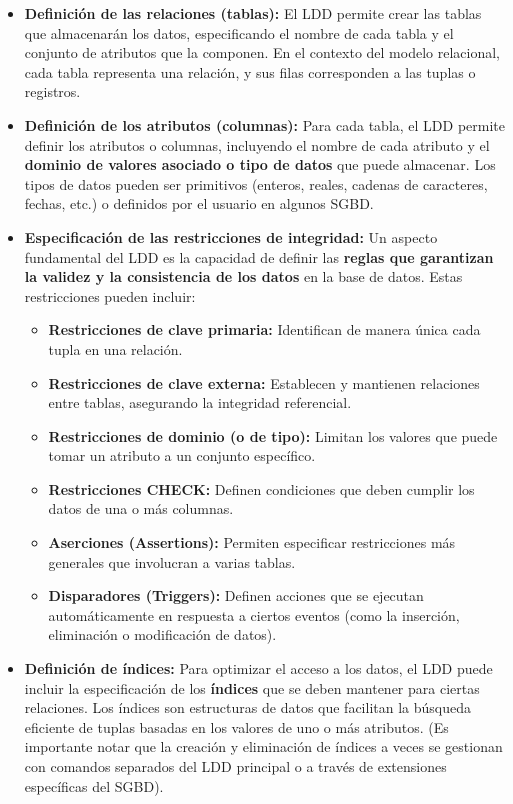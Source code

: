 \begin{itemize}
    \item \textbf{Definición de las relaciones (tablas):} El LDD permite crear las tablas que almacenarán los datos, especificando el nombre de cada tabla y el conjunto de atributos que la componen. En el contexto del modelo relacional, cada tabla representa una relación, y sus filas corresponden a las tuplas o registros.

    \item \textbf{Definición de los atributos (columnas):} Para cada tabla, el LDD permite definir los atributos o columnas, incluyendo el nombre de cada atributo y el \textbf{dominio de valores asociado o tipo de datos} que puede almacenar. Los tipos de datos pueden ser primitivos (enteros, reales, cadenas de caracteres, fechas, etc.) o definidos por el usuario en algunos SGBD.

    \item \textbf{Especificación de las restricciones de integridad:} Un aspecto fundamental del LDD es la capacidad de definir las \textbf{reglas que garantizan la validez y la consistencia de los datos} en la base de datos. Estas restricciones pueden incluir:

    \begin{itemize}
        \item \textbf{Restricciones de clave primaria:} Identifican de manera única cada tupla en una relación.
        \item \textbf{Restricciones de clave externa:} Establecen y mantienen relaciones entre tablas, asegurando la integridad referencial.
        \item \textbf{Restricciones de dominio (o de tipo):} Limitan los valores que puede tomar un atributo a un conjunto específico.
        \item \textbf{Restricciones CHECK:} Definen condiciones que deben cumplir los datos de una o más columnas.
        \item \textbf{Aserciones (Assertions):} Permiten especificar restricciones más generales que involucran a varias tablas.
        \item \textbf{Disparadores (Triggers):} Definen acciones que se ejecutan automáticamente en respuesta a ciertos eventos (como la inserción, eliminación o modificación de datos).
    \end{itemize}

    \item \textbf{Definición de índices:} Para optimizar el acceso a los datos, el LDD puede incluir la especificación de los \textbf{índices} que se deben mantener para ciertas relaciones. Los índices son estructuras de datos que facilitan la búsqueda eficiente de tuplas basadas en los valores de uno o más atributos. (Es importante notar que la creación y eliminación de índices a veces se gestionan con comandos separados del LDD principal o a través de extensiones específicas del SGBD).


\end{itemize}
